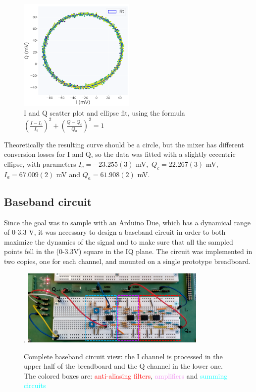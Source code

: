 \documentclass[12pt]{article}
\begin{document}
\begin{figure}[H]
        \centering
        \includegraphics[width=0.5\textwidth]{oscilloscope_circle_before_if_circuit.png}
        \caption{I and Q scatter plot and ellipse fit, using the formula $ \left(\frac{I - I_c}{I_a} \right)^2 + \left(\frac{Q - Q_c}{Q_a} \right)^2 = 1 $}
        \label{IQfit}
    \end{figure}
Theoretically the resulting curve should be a circle, but the mixer has different conversion losses for I and Q, so the data was fitted with a slightly eccentric ellipse, with parameters $I_c = -23.255(3)$ mV,\, $Q_c = 22.267(3)$ mV, $I_{a} = 67.009(2)$ mV and $Q_{a}= 61.908(2)$ mV.
\subsection{Baseband circuit}
Since the goal was to sample with an Arduino Due, which has a dynamical range of 0-3.3 V, it was necessary to design a baseband circuit in order to both maximize the dynamics of the signal and to make sure that all the sampled points fell in the (0-3.3V) square in the IQ plane. The circuit was implemented in two copies, one for each channel, and mounted on a single prototype breadboard.
\begin{figure}[H].
        \centering
        \includegraphics[width=0.80\textwidth]{circuitobase.PNG}
        \caption{Complete baseband circuit view: the I channel is processed in the upper half of the breadboard and the Q channel in the lower one. The colored boxes are: \textcolor{red}{anti-aliasing filters}, \textcolor{violet}{amplifiers} and \textcolor{cyan}{summing circuits} }
        \label{breadboard}
    \end{figure}
\end{document}
